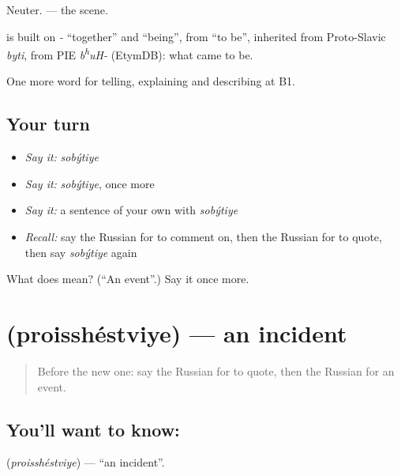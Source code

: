 Neuter. \emph{ } — the scene.

\begin{cousinweb}
\emph{} is built on \emph{-} \textquotedblleft{}together\textquotedblright{} and \emph{} \textquotedblleft{}being\textquotedblright{}, from \emph{} \textquotedblleft{}to be\textquotedblright{}, inherited from Proto-Slavic \emph{byti}, from PIE \emph{b\textsuperscript{h}uH-} (EtymDB): what came to be.
\end{cousinweb}

\begin{grammarlens}[title={What you've built}]
One more word for telling, explaining and describing at B1.
\end{grammarlens}

\subsection*{Your turn}
\begin{itemize}
\raggedright
  \item \emph{Say it:} \emph{sobýtiye}
  \item \emph{Say it:} \emph{sobýtiye}, once more
  \item \emph{Say it:} a sentence of your own with \emph{sobýtiye}
  \item \emph{Recall:} say the Russian for to comment on, then the Russian for to quote, then say \emph{sobýtiye} again
\end{itemize}

\begin{tcolorbox}[breakable,colback=teal!4,colframe=teal!35!black,title={Before you move on}]
What does  mean? (\textquotedblleft{}An event\textquotedblright{}.) Say it once more.
\end{tcolorbox}
\section[\texorpdfstring{\ru{происшествие} (proisshéstviye)}{происшествие (proisshéstviye)}]{ (proisshéstviye) — an incident}

\label{lesson:RU-C285-proisshestviye}



\begin{quote}
Before the new one: say the Russian for to quote, then the Russian for an event.
\end{quote}

\subsection*{You'll want to know: }
\textbf{} (\emph{proisshéstviye}) — \textquotedblleft{}an incident\textquotedblright{}.

